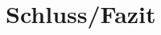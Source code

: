 \documentclass[
    fontsize=12pt,
    headings=small,
    parskip=half,           %
    bibliography=totoc,9
    numbers=noenddot,       %
    open=any,               %
    ]{scrreprt}
\begin{document}
\chapter{Schluss/Fazit}

\begin{comment}

\chapter{Vorbemerkung}

Um auf die wiederholten Fragen von Studierenden nach dem Umfang, formalen Aufbau und Erscheinungsbild, das bei Seminar-, Studien-, Bachelor-, Master- und Diplomarbeiten erwartet wird, einheitlich zu antworten, wird dieses Dokument bereitgestellt.

Diese Hinweise haben Empfehlungscharakter. Bei Unklarheiten stehen die Mitarbeiter der Arbeitsgruppe für weitere Auskünfte zur Verfügung. Als Muster steht auch eine große Anzahl abgeschlossener Arbeiten zur Ansicht zur Verfügung.

\chapter{Inhalt}

Eine Seminar-, Studien-, Bachelor-, Master- und Diplomarbeit ist eine längere wissenschaftliche Abhandlung, mit der die Studierenden zeigen sollen, dass sie in einem vorgegebenen Zeitrahmen in der Lage sind, wissenschaftlich zu arbeiten.

\section{Anforderungen an eine Arbeit}

Eine Seminar-, Studien-, Bachelor-, Master- und Diplomarbeit trägt inhaltlich normalerweise zu einem aktuell am Arbeitsbereich bearbeiteten Forschungsthema bzw. -projekt bei oder leistet einen Beitrag in der Lehre (z.\,B. Erstellung eines Lehrmittels).

Normalerweise besteht eine Arbeit aus einem darstellenden und einem konstruktiven Teil. Im darstellenden Teil wird gezeigt, dass mit wissenschaftlicher Literatur umgegangen, Wichtiges von Unwichtigem getrennt werden kann und die relevanten Aspekte etwaiger Vorarbeiten erfasst und dargestellt werden können. Im konstruktiven Teil werden dann eigene Lösungen erarbeitet und bewertet.


\end{comment}
\end{document}
